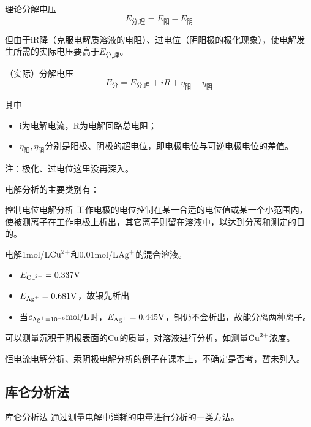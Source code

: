 \begin{definition*}{理论分解电压}{}
	\begin{equation*}
	E_{\text{分,理}}=E_{\text{阳}}-E_{\text{阴}}
	\end{equation*}
\end{definition*}

但由于iR降（克服电解质溶液的电阻）、过电位（阴阳极的极化现象），使电解发生所需的实际电压要高于$E_{\text{分,理}}$。

\begin{definition*}{（实际）分解电压}{}
	\begin{equation*}
	E_{\text{分}}=E_{\text{分,理}}+iR+\eta_{\text{阳}}-\eta_{\text{阴}}
	\end{equation*}
\end{definition*}

其中
\begin{itemize}
	\item i为电解电流，R为电解回路总电阻；
	\item $\eta_{\text{阳}},\eta_{\text{阴}}$分别是阳极、阴极的超电位，即电极电位与可逆电极电位的差值。
\end{itemize}

注：极化、过电位这里没再深入。

电解分析的主要类别有：
\begin{definition*}{控制电位电解分析}{}
	工作电极的电位控制在某一合适的电位值或某一个小范围内，使被测离子在工作电极上析出，其它离子则留在溶液中，以达到{\heiti 分离和测定}的目的。
\end{definition*}

\begin{example}
	电解1mol/L$\ce{Cu^2+}$和0.01mol/L$\ce{Ag+}$的混合溶液。
	
	\begin{itemize}
		\item $E_{\ce{Cu^2+}}=0.337\mathrm{V}$
		\item $E_{\ce{Ag+}}=0.681\mathrm{V}$，故银先析出
		\item 当$c_{\ce{Ag+}=10^{-6}}\mathrm{mol/L}$时，$E_{\ce{Ag+}}=0.445\mathrm{V}$，铜仍不会析出，故能分离两种离子。
	\end{itemize}
	
	可以测量沉积于阴极表面的$\ce{Cu}$的质量，对溶液进行分析，如测量$\ce{Cu^2+}$浓度。
\end{example}

恒电流电解分析、汞阴极电解分析的例子在课本上，不确定是否考，暂未列入。

\subsection{库仑分析法}
\begin{definition*}{库仑分析法}{}
	通过测量电解中消耗的电量进行分析的一类方法。
\end{definition*}
	
